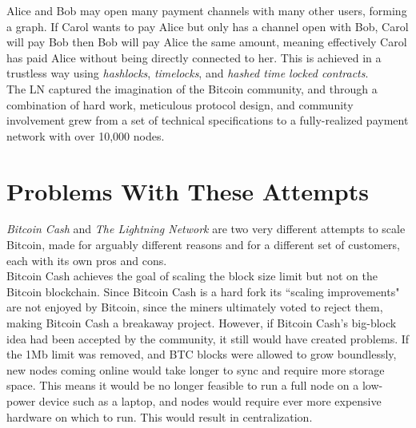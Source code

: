 \documentclass{report}
\begin{document}
		Alice and Bob may open many payment channels with many other users, forming a graph. If Carol wants to pay Alice but only has a channel open with Bob, Carol will pay Bob then Bob will pay Alice the same amount, meaning effectively Carol has paid Alice without being directly connected to her. This is achieved in a trustless way using \textit{hashlocks}\cite{hashlock}, \textit{timelocks}\cite{timelock}, and \textit{hashed time locked contracts}\cite{htlc}. \\
		
		The LN captured the imagination of the Bitcoin community, and through a combination of hard work, meticulous protocol design, and community involvement grew from a set of technical specifications to a fully-realized payment network with over 10,000 \cite{lnstats} nodes.
		
	\section{Problems With These Attempts}
	
	\textit{Bitcoin Cash}   and \textit{The Lightning Network}  are two very different attempts to scale  Bitcoin, made for arguably different reasons and for a different set of customers, each with its own pros and cons. \\
	
		Bitcoin Cash achieves the goal of scaling the block size limit  but not on the Bitcoin blockchain. Since Bitcoin Cash is a hard fork  its ``scaling improvements" are not enjoyed by Bitcoin, since the miners  ultimately voted to reject them, making Bitcoin Cash   a breakaway project. However, if Bitcoin Cash's big-block idea had been accepted by the community, it still would have created problems. If the 1Mb limit was removed, and BTC blocks were allowed to grow boundlessly, new nodes coming online would take longer to sync  and require more storage space. This means it would be no longer feasible to run a full node on a low-power device such as a laptop, and nodes would require ever more expensive hardware on which to run. This would result in centralization.  \\
	
\end{document}
